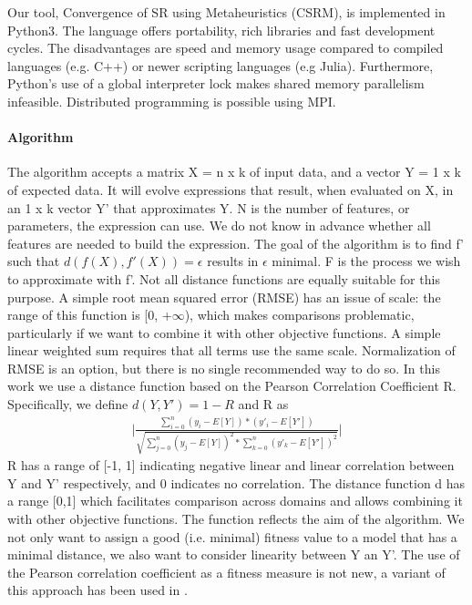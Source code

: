 Our tool, Convergence of SR using Metaheuristics (CSRM), is implemented in Python3. The language offers portability, rich libraries and fast development cycles. The disadvantages are speed and memory usage compared to compiled languages (e.g. C++) or newer scripting languages (e.g Julia).
Furthermore, Python's use of a global interpreter lock makes shared memory parallelism infeasible. Distributed programming is possible using MPI.
\paragraph{Algorithm}
The algorithm accepts a matrix X = n x k of input data, and a vector Y = 1 x k of expected data. It will evolve expressions that result, when evaluated on X, in an 1 x k vector Y' that approximates Y. N is the number of features, or parameters, the expression can use. We do not know in advance whether all features are needed to build the expression.
The goal of the algorithm is to find f' such that $ d(f(X), f'(X))=\epsilon$ results in $\epsilon$ minimal. F is the process we wish to approximate with f'. Not all distance functions are equally suitable for this purpose. A simple root mean squared error (RMSE) has an issue of scale: the range of this function is [0, +$\infty$), which makes comparisons problematic, particularly if we want to combine it with other objective functions. A simple linear weighted sum requires that all terms use the same scale.
Normalization of RMSE is an option, but there is no single recommended way to do so.
In this work we use a distance function based on the Pearson Correlation Coefficient R. Specifically, we define $d(Y,Y') = 1 - R$ and R as
\begin{equation}
\begin{aligned}
 \lvert \frac{\sum_{i=0}^{n}{(y_i-E[Y])*(y'_i-E[Y'])}}{\sqrt{\sum_{j=0}^{n}{(y_j-E[Y])^2}*\sum_{k=0}^{n}{(y'_k-E[Y'])^2}}}
\lvert 
\end{aligned}
\end{equation}
R has a range of [-1, 1] indicating negative linear and linear correlation between Y and Y' respectively, and 0 indicates no correlation. The distance function d has a range [0,1] which facilitates comparison across domains and allows combining it with other objective functions. The function reflects the aim of the algorithm. We not only want to assign a good (i.e. minimal) fitness value to a model that has a minimal distance, we also want to consider linearity between Y an Y'. The use of the Pearson correlation coefficient as a fitness measure is not new, a variant of this approach has been used in \citep{pearson}.

